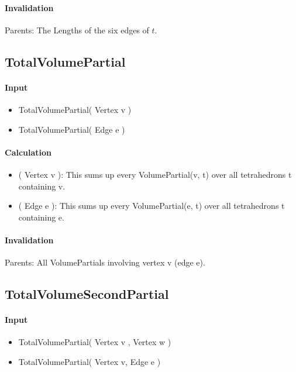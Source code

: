 \paragraph{Invalidation}

\bigskip Parents: The Lengths of the six edges of $t$.

\subsection{TotalVolumePartial}

\paragraph{Input}

\begin{itemize}
\item TotalVolumePartial( Vertex v )

\item TotalVolumePartial( Edge e )
\end{itemize}

\paragraph{Calculation}

\begin{itemize}
\item ( Vertex v ): This sums up every VolumePartial(v, t) over all
tetrahedrons t containing v.

\item ( Edge e ): This sums up every VolumePartial(e, t) over all
tetrahedrons t containing e.
\end{itemize}

\paragraph{Invalidation}

Parents: All VolumePartials involving vertex v (edge e).

\subsection{TotalVolumeSecondPartial}

\paragraph{Input}

\begin{itemize}
\item TotalVolumePartial( Vertex v , Vertex w )

\item TotalVolumePartial( Vertex v, Edge e )
\end{itemize}

